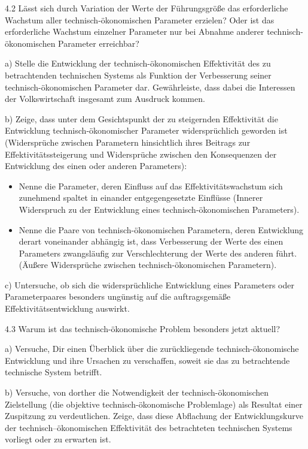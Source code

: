\documentclass[12pt,a4paper]{article}
\begin{document}
4.2 Lässt sich durch Variation der Werte der Führungsgröße das erforderliche
Wachstum aller technisch-ökonomischen Parameter erzielen? Oder ist das
erforderliche Wachstum einzelner Parameter nur bei Abnahme anderer
technisch-ökonomischen Parameter erreichbar?

a) Stelle die Entwicklung der technisch-ökonomischen Effektivität des zu
betrachtenden technischen Systems als Funktion der Verbesserung seiner
technisch-ökonomischen Parameter dar. Gewährleiste, dass dabei die Interessen
der Volkswirtschaft insgesamt zum Ausdruck kommen.

b) Zeige, dass unter dem Gesichtspunkt der zu steigernden Effektivität die
Entwicklung technisch-ökonomischer Parameter widersprüchlich geworden ist
(Widersprüche zwischen Parametern hinsichtlich ihres Beitrags zur
Effektivitätssteigerung und Widersprüche zwischen den Konsequenzen der
Entwicklung des einen oder anderen Parameters):
\begin{itemize}
\item Nenne die Parameter, deren Einfluss auf das Effektivitätswachstum sich
  zunehmend spaltet in einander entgegengesetzte Einflüsse (Innerer Widerspruch
  zu der Entwicklung eines technisch-ökonomischen Parameters).
\item Nenne die Paare von technisch-ökonomischen Parametern, deren Entwicklung
  derart voneinander abhängig ist, dass Verbesserung der Werte des einen
  Parameters zwangsläufig zur Verschlechterung der Werte des anderen
  führt. (Äußere Widersprüche zwischen technisch-ökonomischen Parametern).
\end{itemize}

c) Untersuche, ob sich die widersprüchliche Entwicklung eines Parameters oder
Parameterpaares besonders ungünstig auf die auftragsgemäße
Effektivitätsentwicklung auswirkt.

4.3  Warum ist das technisch-ökonomische Problem besonders jetzt aktuell?

a) Versuche, Dir einen Überblick über die zurückliegende technisch-ökonomische
Entwicklung und ihre Ursachen zu verschaffen, soweit sie das zu betrachtende
technische System betrifft.

b) Versuche, von dorther die Notwendigkeit der technisch-ökonomischen
Zielstellung (die objektive technisch-ökonomische Problemlage) als Resultat
einer Zuspitzung zu verdeutlichen.  Zeige, dass diese Abflachung der
Entwicklungskurve der technisch–ökonomischen Effektivität des betrachteten
technischen Systems vorliegt oder zu erwarten ist.
\end{document}
